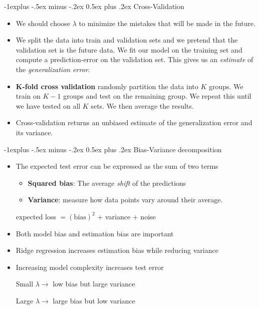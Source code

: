 \documentclass[10pt,a4paper,landscape]{article}
\makeatletter
\renewcommand{\subsection}{\@startsection{subsection}{2}{0mm}%
                                {-1explus -.5ex minus -.2ex}%
                                {0.5ex plus .2ex}%
                                {\normalfont\tiny\bfseries}}
\makeatother
\begin{document}
\begin{multicols*}{4}
\subsection{Cross-Validation}
\begin{itemize}
	\item We should choose $\lambda$ to minimize the mistakes that will be made in the future.
	\item We split the data into train and validation sets and we pretend that the validation set is the future data. We fit our model on the training set and compute a prediction-error on the validation set. This gives us an \textit{estimate} of the \textit{generalization error}.
	\item \textbf{K-fold cross validation} randomly partition the data into $K$ groups. We train on $K - 1$ groups and test on the remaining group. We repeat this until we have tested on all $K$ sets. We then average the results.
	\item Cross-validation returns an unbiased estimate of the generalization error and its variance.
\end{itemize}

\subsection{Bias-Variance decomposition}
\begin{itemize}
	\item The expected test error can be expressed as the sum of two terms
	\begin{itemize}
	 	\item \textbf{Squared bias}: The average \textit{shift} of the predictions 
	 	\item \textbf{Variance}: measure how data points vary around their average.
	 \end{itemize} 
	 \begin{center}
	 	expected loss $= (\text{bias})^2$ + variance + noise
	 \end{center}
	\item Both model bias and estimation bias are important
	\item Ridge regression increases estimation bias while reducing variance
	\item Increasing model complexity increases test error
	\begin{center}
		Small $\lambda \rightarrow$ low bias but large variance
	\end{center}
	\begin{center}
		Large $\lambda \rightarrow$ large bias but low variance
	\end{center}
\end{itemize}


\end{multicols*}
\end{document}
